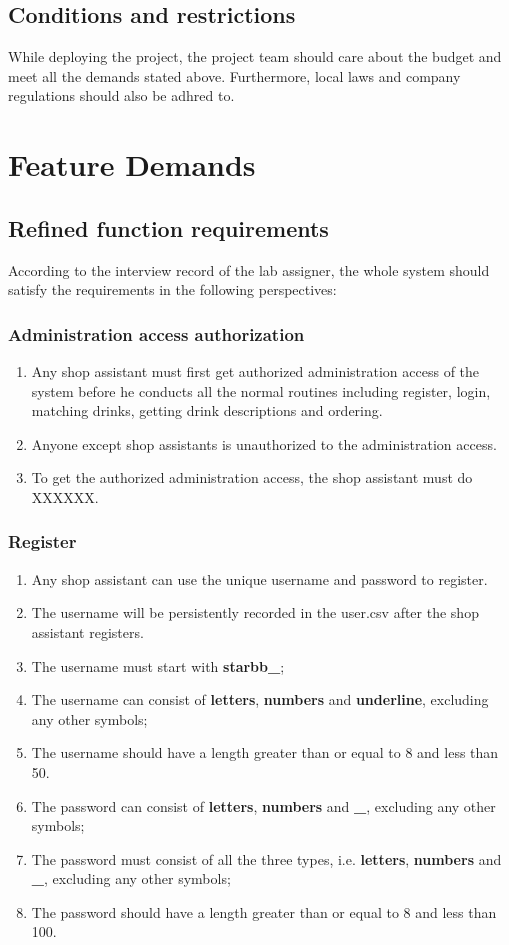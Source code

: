 \documentclass[a4paper]{report}
\begin{document}
\section{Conditions and restrictions}
While deploying the project, the project team should care about the budget and meet all the demands stated above. Furthermore, local laws and company regulations should also be adhred to.
\chapter{Feature Demands}

\section{Refined function requirements}
According to the interview record of the lab assigner, the whole system should satisfy the requirements in the following perspectives:
\subsection{Administration access authorization}
\begin{enumerate}
\item Any shop assistant must first get authorized administration access of the system before he conducts all the normal routines including register, login, matching drinks, getting drink descriptions and ordering. 
\item Anyone except shop assistants is unauthorized to the administration access.
\item To get the authorized administration access, the shop assistant must do XXXXXX.
\end{enumerate}

\subsection{Register}
\begin{enumerate}
\item Any shop assistant can use the unique username and password to register.
\item The username will be persistently recorded in the user.csv after the shop assistant registers.
\item The username must start with \textbf{starbb\_};
\item The username can consist of \textbf{letters}, \textbf{numbers} and \textbf{underline}, excluding any other symbols;
\item The username should have a length greater than or equal to 8 and less than 50.
\item The password can consist of \textbf{letters}, \textbf{numbers} and \textbf{\_}, excluding any other symbols;
\item The password must consist of all the three types, i.e. \textbf{letters}, \textbf{numbers} and \textbf{\_}, excluding any other symbols;
\item The password should have a length greater than or equal to 8 and less than 100.
\end{enumerate}
\end{document}
